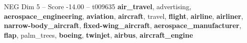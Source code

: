\begin{textsample}{NEG Dim 5 – Score -14.00 – t009635}  \label{ex:f5_neg_026}
\textbf{air\_travel}, advertising, \textbf{aerospace\_engineering}, \textbf{aviation}, \textbf{aircraft}, travel, \textbf{flight}, \textbf{airline}, \textbf{airliner}, \textbf{narrow-body\_aircraft}, \textbf{fixed-wing\_aircraft}, \textbf{aerospace\_manufacturer}, \textbf{flap}, palm\_trees, \textbf{boeing}, \textbf{twinjet}, \textbf{airbus}, \textbf{aircraft\_engine}

\end{textsample}

